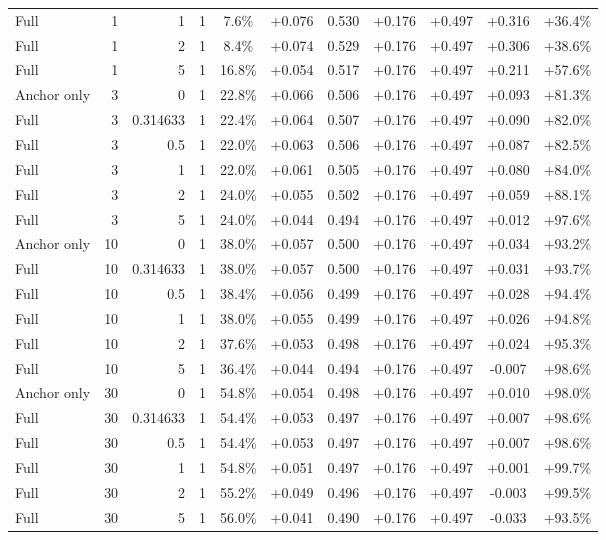 \begin{table}[htbp]
\begin{tabular}{lrrrccccccc}
Full & 1 & 1 & 1 & 7.6\% & +0.076 & 0.530 & +0.176 & +0.497 & +0.316 & +36.4\% \\
Full & 1 & 2 & 1 & 8.4\% & +0.074 & 0.529 & +0.176 & +0.497 & +0.306 & +38.6\% \\
Full & 1 & 5 & 1 & 16.8\% & +0.054 & 0.517 & +0.176 & +0.497 & +0.211 & +57.6\% \\
Anchor only & 3 & 0 & 1 & 22.8\% & +0.066 & 0.506 & +0.176 & +0.497 & +0.093 & +81.3\% \\
Full & 3 & 0.314633 & 1 & 22.4\% & +0.064 & 0.507 & +0.176 & +0.497 & +0.090 & +82.0\% \\
Full & 3 & 0.5 & 1 & 22.0\% & +0.063 & 0.506 & +0.176 & +0.497 & +0.087 & +82.5\% \\
Full & 3 & 1 & 1 & 22.0\% & +0.061 & 0.505 & +0.176 & +0.497 & +0.080 & +84.0\% \\
Full & 3 & 2 & 1 & 24.0\% & +0.055 & 0.502 & +0.176 & +0.497 & +0.059 & +88.1\% \\
Full & 3 & 5 & 1 & 24.0\% & +0.044 & 0.494 & +0.176 & +0.497 & +0.012 & +97.6\% \\
Anchor only & 10 & 0 & 1 & 38.0\% & +0.057 & 0.500 & +0.176 & +0.497 & +0.034 & +93.2\% \\
Full & 10 & 0.314633 & 1 & 38.0\% & +0.057 & 0.500 & +0.176 & +0.497 & +0.031 & +93.7\% \\
Full & 10 & 0.5 & 1 & 38.4\% & +0.056 & 0.499 & +0.176 & +0.497 & +0.028 & +94.4\% \\
Full & 10 & 1 & 1 & 38.0\% & +0.055 & 0.499 & +0.176 & +0.497 & +0.026 & +94.8\% \\
Full & 10 & 2 & 1 & 37.6\% & +0.053 & 0.498 & +0.176 & +0.497 & +0.024 & +95.3\% \\
Full & 10 & 5 & 1 & 36.4\% & +0.044 & 0.494 & +0.176 & +0.497 & -0.007 & +98.6\% \\
Anchor only & 30 & 0 & 1 & 54.8\% & +0.054 & 0.498 & +0.176 & +0.497 & +0.010 & +98.0\% \\
Full & 30 & 0.314633 & 1 & 54.4\% & +0.053 & 0.497 & +0.176 & +0.497 & +0.007 & +98.6\% \\
Full & 30 & 0.5 & 1 & 54.4\% & +0.053 & 0.497 & +0.176 & +0.497 & +0.007 & +98.6\% \\
Full & 30 & 1 & 1 & 54.8\% & +0.051 & 0.497 & +0.176 & +0.497 & +0.001 & +99.7\% \\
Full & 30 & 2 & 1 & 55.2\% & +0.049 & 0.496 & +0.176 & +0.497 & -0.003 & +99.5\% \\
Full & 30 & 5 & 1 & 56.0\% & +0.041 & 0.490 & +0.176 & +0.497 & -0.033 & +93.5\% \\

\end{tabular}
\end{table}
